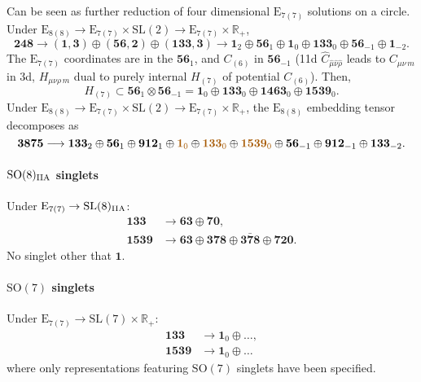 \documentclass[11pt]{article}
\newcommand{\SO}{\ensuremath{\mathrm{SO}}\xspace}
\newcommand{\SL}{\ensuremath{\mathrm{SL}}\xspace}
\newcommand{\E}{\ensuremath{\mathrm{E}}\xspace}
\newcommand{\R}{\ensuremath{\mathbb{R}}\xspace}
\begin{document}
Can be seen as further reduction of four dimensional $\E_{7(7)}$ solutions on a circle. Under $\E_{8(8)}\rightarrow\E_{7(7)}\times\SL(2)\rightarrow\E_{7(7)}\times\R_{+}$,
\begin{equation}
  \bm{248} \longrightarrow (\bm{1},\bm{3}) \oplus (\bm{56},\bm{2}) \oplus (\bm{133},\bm{3})\longrightarrow \bm{1}_{2} \oplus \bm{56}_{1} \oplus \bm{1}_{0} \oplus \bm{133}_{0} \oplus \bm{56}_{-1} \oplus \bm{1}_{-2}.
\end{equation}
The $\E_{7(7)}$ coordinates are in the $\bm{56}_{1}$, and $C_{(6)}$ in $\bm{56}_{-1}$ (11d $\hat{C}_{\hat\mu\hat\nu\hat\rho}$ leads to $C_{\mu\nu\,m}$ in 3d, $H_{\mu\nu\rho\,m}$ dual to purely internal $H_{(7)}$ of potential $C_{(6)}$). Then,
\begin{equation}
    H_{(7)} \subset \bm{56}_{1} \otimes \bm{56}_{-1} = \bm{1}_{0} \oplus \bm{133}_{0} \oplus \bm{1463}_{0} \oplus \bm{1539}_{0}.
\end{equation}
Under $\E_{8(8)}\rightarrow\E_{7(7)}\times\SL(2)\rightarrow\E_{7(7)}\times\R_{+}$, the $\E_{8(8)}$ embedding tensor decomposes as
\begin{equation}
    \bm{3875} \longrightarrow \bm{133}_{2} \oplus \bm{56}_{1} \oplus \bm{912}_{1} \oplus {\color{mydarkorange}\bm{1}_{0}} \oplus {\color{mydarkorange}\bm{133}_{0}} \oplus {\color{mydarkorange}\bm{1539}_{0}} \oplus \bm{56}_{-1} \oplus \bm{912}_{-1} \oplus \bm{133}_{-2}.
\end{equation}

\paragraph{\boldmath $\SO(8)_{\rm IIA}$ singlets}
Under $\E_{7(7)}\rightarrow\SL(8)_{\rm IIA}$:
\begin{equation}
  \begin{aligned}
    \bm{133} & \longrightarrow \bm{63} \oplus \bm{70},\\
    \bm{1539} & \longrightarrow \bm{63} \oplus \bm{378} \oplus \bm{\bar{378}} \oplus \bm{720}.
  \end{aligned}
\end{equation}
No singlet other that $\bm{1}$.

\paragraph{\boldmath $\SO(7)$ singlets}
Under $\E_{7(7)}\rightarrow\SL(7)\times\R_{+}$:
\begin{equation}
  \begin{aligned}
    \bm{133} & \longrightarrow \bm{1}_{0} \oplus \ldots,\\
    \bm{1539} & \longrightarrow \bm{1}_{0} \oplus \ldots
  \end{aligned}
\end{equation}
where only representations featuring $\SO(7)$ singlets have been specified.
\end{document}
